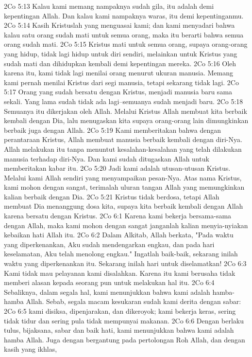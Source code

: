 2Co 5:13  Kalau kami memang nampaknya sudah gila, itu adalah demi kepentingan Allah. Dan kalau kami nampaknya waras, itu demi kepentinganmu.
2Co 5:14  Kasih Kristuslah yang menguasai kami; dan kami menyadari bahwa kalau satu orang sudah mati untuk semua orang, maka itu berarti bahwa semua orang sudah mati.
2Co 5:15  Kristus mati untuk semua orang, supaya orang-orang yang hidup, tidak lagi hidup untuk diri sendiri, melainkan untuk Kristus yang sudah mati dan dihidupkan kembali demi kepentingan mereka.
2Co 5:16  Oleh karena itu, kami tidak lagi menilai orang menurut ukuran manusia. Memang kami pernah menilai Kristus dari segi manusia, tetapi sekarang tidak lagi.
2Co 5:17  Orang yang sudah bersatu dengan Kristus, menjadi manusia baru sama sekali. Yang lama sudah tidak ada lagi--semuanya sudah menjadi baru.
2Co 5:18  Semuanya itu dikerjakan oleh Allah. Melalui Kristus Allah membuat kita berbaik kembali dengan Dia, lalu menugaskan kita supaya orang-orang lain dimungkinkan berbaik juga dengan Allah.
2Co 5:19  Kami memberitakan bahwa dengan perantaraan Kristus, Allah membuat manusia berbaik kembali dengan diri-Nya. Allah melakukan itu tanpa menuntut kesalahan-kesalahan yang telah dilakukan manusia terhadap diri-Nya. Dan kami sudah ditugaskan Allah untuk memberitakan kabar itu.
2Co 5:20  Jadi kami adalah utusan-utusan Kristus. Melalui kami Allah sendiri yang menyampaikan pesan-Nya. Atas nama Kristus, kami mohon dengan sangat, terimalah uluran tangan Allah yang memungkinkan kalian berbaik dengan Dia.
2Co 5:21  Kristus tidak berdosa, tetapi Allah membuat Dia menanggung dosa kita, supaya kita berbaik kembali dengan Allah karena bersatu dengan Kristus.
2Co 6:1  Karena kami bekerja bersama-sama dengan Allah, maka kami mohon dengan sangat janganlah kalian menyia-nyiakan kebaikan hati Allah itu.
2Co 6:2  Dalam Alkitab, Allah berkata, "Pada waktu yang diperkenankan, Aku sudah mendengarkan engkau, dan pada hari keselamatan, Aku telah menolong engkau." Ingatlah baik-baik, sekarang inilah waktu yang diperkenankan itu. Sekarang inilah hari untuk diselamatkan!
2Co 6:3  Kami tidak mau pelayanan kami disalahkan. Karena itu kami berusaha tidak memberi alasan kepada seorang pun untuk melakukan hal itu.
2Co 6:4  Sebaliknya, dalam segala hal, kami menunjukkan bahwa kami adalah hamba-hamba Allah. Sebab, segala macam kesukaran sudah kami derita dengan sabar:
2Co 6:5  kami disiksa, dipenjarakan, dan dikeroyok; kami bekerja keras, sering tidak tidur dan sering pula tidak mempunyai makanan.
2Co 6:6  Dengan berlaku tulus, bijaksana, sabar dan baik hati, kami menunjukkan bahwa kami adalah hamba Allah. Juga dengan bergantung pada pertolongan Roh Allah, dan dengan kasih yang ikhlas,
